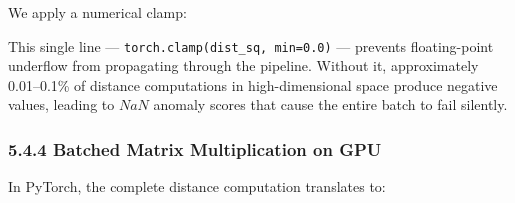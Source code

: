 We apply a numerical clamp:

\begin{Shaded}
\begin{Highlighting}[]
\OperatorTok{=}\OperatorTok{+}\OperatorTok{{-}}  \OperatorTok{*}
\OperatorTok{=}\OperatorTok{=}\NormalTok{)  }
\OperatorTok{=}
\end{Highlighting}
\end{Shaded}

This single line --- \texttt{torch.clamp(dist\_sq,\ min=0.0)} --- prevents floating-point underflow from propagating through the pipeline. Without it, approximately 0.01--0.1\% of distance computations in high-dimensional space produce negative values, leading to \(NaN\) anomaly scores that cause the entire batch to fail silently.

\subsubsection{5.4.4 Batched Matrix Multiplication on GPU}\label{batched-matrix-multiplication-on-gpu}

In PyTorch, the complete distance computation translates to:

\begin{Shaded}
\begin{Highlighting}[]
\OperatorTok{=}\NormalTok{ (}\OperatorTok{**} \OperatorTok{=}\NormalTok{)  }

\OperatorTok{=}\OperatorTok{**} \OperatorTok{=}\OperatorTok{=}\NormalTok{)    }
\OperatorTok{=}
\OperatorTok{=}\OperatorTok{+}\OperatorTok{{-}}  \OperatorTok{*}
\OperatorTok{=}\OperatorTok{=}\NormalTok{)}
\end{Highlighting}
\end{Shaded}

